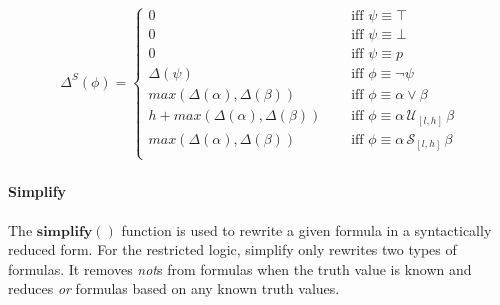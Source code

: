 \documentclass[]{llncs}
\begin{document}
\begin{align*}
\Delta^{S}(\phi) = \left\lbrace
\begin{aligned}
0 & \quad \text{ iff } \psi \equiv \top \\
0 & \quad \text{ iff } \psi \equiv \bot \\
0 & \quad \text{ iff } \psi \equiv p \\
\Delta(\psi) & \quad \text{ iff } \phi \equiv \neg \psi \\
max(\Delta(\alpha),\Delta(\beta)) & \quad \text{ iff } \phi \equiv \alpha \vee \beta \\
h + max(\Delta(\alpha),\Delta(\beta)) & \quad \text{ iff } \phi \equiv \alpha\, \mathcal{U}_{[l,h]}\, \beta \\
max(\Delta(\alpha),\Delta(\beta)) & \quad \text{ iff } \phi \equiv \alpha\, \mathcal{S}_{[l,h]}\, \beta \\
\end{aligned} \right. 
\end{align*}


\paragraph{Simplify}
The $\mathbf{simplify()}$ function is used to rewrite a given formula in a syntactically reduced form. For the restricted logic, simplify only rewrites two types of formulas. It removes \emph{not}s from formulas when the truth value is known and reduces \emph{or} formulas based on any known truth values. 
\end{document}
